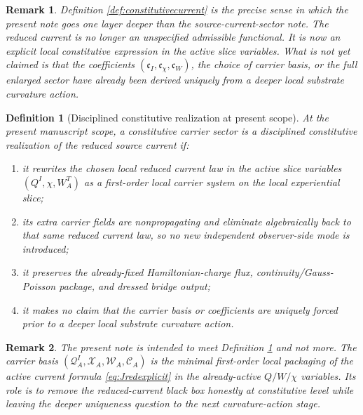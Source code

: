 \documentclass[11pt]{article}
\newcommand{\ConstCurrent}{\mathcal C}
\newcommand{\QCarrier}{\mathcal Q}
\newcommand{\ChiCarrier}{\mathcal X}
\newcommand{\TransCarrier}{\mathcal W}
\newtheorem{definition}{Definition}
\newtheorem{remark}{Remark}
\begin{document}
\begin{remark}
Definition \ref{def:constitutivecurrent} is the precise sense in which the present note goes one layer deeper than the source-current-sector note. The reduced current is no longer an unspecified admissible functional. It is now an explicit local constitutive expression in the active slice variables. What is \emph{not} yet claimed is that the coefficients \((\mathfrak c_I,\mathfrak c_\chi,\mathfrak c_W)\), the choice of carrier basis, or the full enlarged sector have already been derived uniquely from a deeper local substrate curvature action.
\end{remark}

\begin{definition}[Disciplined constitutive realization at present scope]
\label{def:disciplined}
At the present manuscript scope, a constitutive carrier sector is a \emph{disciplined constitutive realization} of the reduced source current if:
\begin{enumerate}
    \item it rewrites the chosen local reduced current law in the active slice variables \((Q^I,\chi,W_A^T)\) as a first-order local carrier system on the local experiential slice;
    \item its extra carrier fields are nonpropagating and eliminate algebraically back to that same reduced current law, so no new independent observer-side mode is introduced;
    \item it preserves the already-fixed Hamiltonian-charge flux, continuity/Gauss-Poisson package, and dressed bridge output;
    \item it makes no claim that the carrier basis or coefficients are uniquely forced prior to a deeper local substrate curvature action.
\end{enumerate}
\end{definition}

\begin{remark}
The present note is intended to meet Definition \ref{def:disciplined} and not more. The carrier basis \((\QCarrier^I_A,\ChiCarrier_A,\TransCarrier_A,\ConstCurrent_A)\) is the minimal first-order local packaging of the active current formula \eqref{eq:Jredexplicit} in the already-active \(Q/W/\chi\) variables. Its role is to remove the reduced-current black box honestly at constitutive level while leaving the deeper uniqueness question to the next curvature-action stage.
\end{remark}
\end{document}
